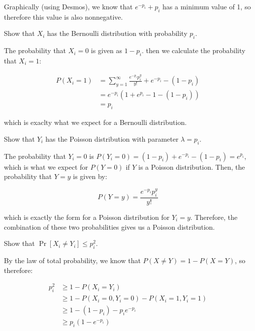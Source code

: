 \documentclass[11pt]{article}
\begin{document}
\begin{Parts}
\begin{solution}
        Graphically (using Desmos), we know that $e^{-p_i} + p_i$ has a minimum value of 1, so therefore this value is also nonnegative. 
    \end{solution}
    \Part Show that $X_i$ has the Bernoulli distribution with probability $p_i$.

    \begin{solution}
        The probability that $X_i = 0$ is given as $1 - p_i$. then we calculate the probability that $X_i = 1$: 

        \begin{align*}
            P(X_i = 1) &= \sum_{y = 1}^\infty \frac{e^{-p_i}p_i^y}{y!} + e^{-p_i} - (1 - p_i)\\
            &= e^{-p_i}(1 + e^{p_i} - 1 - (1 - p_i))\\
            &= p_i
        \end{align*}

        which is exaclty what we expect for a Bernoulli distribution.
    \end{solution}
    \Part Show that $Y_i$ has the Poisson distribution with parameter $\lambda = p_i$.

    \begin{solution}
        The probability that $Y_i = 0$ is $P(Y_i = 0) = (1 - p_i) + e^{-p_i} - (1 - p_i) = e^{p_i}$, which is what we expect for $P(Y = 0)$ if $Y$ is a Poisson distribution. Then, the probability that $Y = y$ is given by: 

        \[ P(Y = y) = \frac{e^{-p_i}p_i^y}{y!}\] 

        which is exactly the form for a Poisson distribution for $Y_i = y$. Therefore, the combination of these two probabilities gives us a Poisson distribution.
    \end{solution}
    \Part Show that $\Pr[X_i \neq Y_i] \leq p_i^2$.

    \begin{solution}
        By the law of total probability, we know that $P(X \neq Y) = 1 - P(X = Y)$, so therefore: 

        \begin{align*}
            p_i^2 &\ge 1 - P(X_i = Y_i)\\
            &\ge 1 - P(X_i = 0, Y_i = 0) - P(X_i = 1, Y_i = 1)\\
            &\ge 1 - (1 - p_i) - p_ie^{-p_i}\\
            &\ge p_i(1 - e^{-p_i})
        \end{align*}


\end{solution}
\end{Parts}
\end{document}
